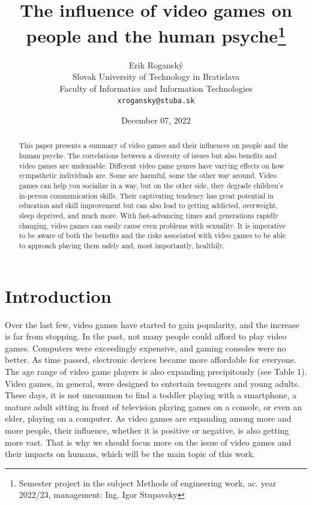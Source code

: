 \documentclass[10pt,twoside,english,a4paper]{article}
\title{The influence of video games on people and the human psyche\thanks{Semester project in the subject Methods of engineering work, ac. year 2022/23, management: Ing. Igor Stupavsky}}
\author{Erik Roganský\\[2pt]
	{\small Slovak University of Technology in Bratislava}\\
	{\small Faculty of Informatics and Information Technologies}\\
	{\small \texttt{xrogansky@stuba.sk}}
	}
\date{\small December 07, 2022}
\begin{document}
\maketitle

\begin{abstract}
This paper presents a summary of video games and their influences on people and the human psyche. The correlations between a diversity of issues but also benefits and video games are undeniable. Different video game genres have varying effects on how sympathetic individuals are. Some are harmful, some the other way around. Video games can help you socialize in a way, but on the other side, they degrade children's in-person communication skills. Their captivating tendency has great potential in education and skill improvement but can also lead to getting addicted, overweight, sleep deprived, and much more. With fast-advancing times and generations rapidly changing, video games can easily cause even problems with sexuality. It is imperative to be aware of both the benefits and the risks associated with video games to be able to approach playing them safely and, most importantly, healthily.
\end{abstract}



\section{Introduction} \label{introduction}
Over the last few, video games have started to gain popularity, and the increase is far from stopping. In the past, not many people could afford to play video games. Computers were exceedingly expensive, and gaming consoles were no better. As time passed, electronic devices became more affordable for everyone. The age range of video game players is also expanding precipitously (see Table 1). Video games, in general, were designed to entertain teenagers and young adults. These days, it is not uncommon to find a toddler playing with a smartphone, a mature adult sitting in front of television playing games on a console, or even an elder, playing on a computer. As video games are expanding among more and more people, their influence, whether it is positive or negative, is also getting more vast. That is why we should focus more on the issue of video games and their impacts on humans, which will be the main topic of this work.
\end{document}

